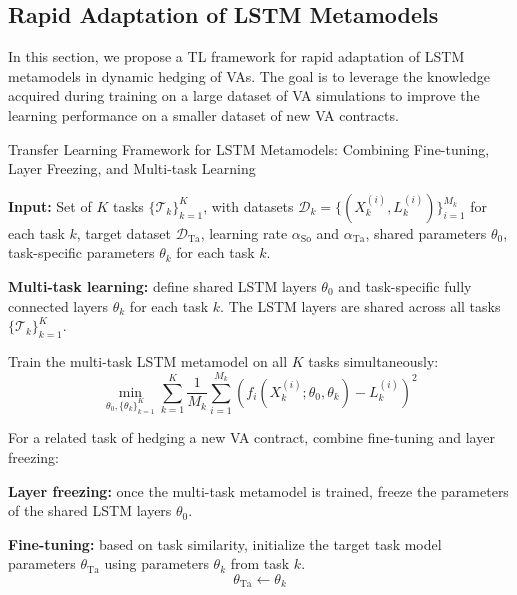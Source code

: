 \subsection{Rapid Adaptation of LSTM Metamodels} \label{sec3:transfer_learning}

In this section, we propose a TL framework for rapid adaptation of LSTM metamodels in dynamic hedging of VAs.
The goal is to leverage the knowledge acquired during training on a large dataset of VA simulations to improve the learning performance on a smaller dataset of new VA contracts.


\begin{algorithm}
    \caption{Transfer Learning Framework for LSTM Metamodels: Combining Fine-tuning, Layer Freezing, and Multi-task Learning}
    \begin{algorithmic}[1] \label{alg3:combined}
        \STATE \textbf{Input:} Set of $K$ tasks $\{\mathcal{T}_k\}_{k=1}^K$, with datasets $\mathcal{D}_k = \{(X_k^{(i)}, L_k^{(i)})\}_{i=1}^{M_k}$ for each task $k$, target dataset $\mathcal{D}_{\text{Ta}}$, learning rate $\alpha_{\text{So}}$ and $\alpha_{\text{Ta}}$, shared parameters $\theta_0$, task-specific parameters $\theta_k$ for each task $k$.
        
        \STATE \textbf{Multi-task learning:} define shared LSTM layers $\theta_0$ and task-specific fully connected layers $\theta_k$ for each task $k$. The LSTM layers are shared across all tasks $\{\mathcal{T}_k\}_{k=1}^K$.
        
        \STATE Train the multi-task LSTM metamodel on all $K$ tasks simultaneously:
        \begin{equation}
            \min_{\theta_0, \{\theta_k\}_{k=1}^K} \sum_{k=1}^K \frac{1}{M_k} \sum_{i=1}^{M_k} \left( f_i(X_k^{(i)}; \theta_0, \theta_k) - L_k^{(i)} \right)^2
        \end{equation}
        
        \STATE For a related task of hedging a new VA contract, combine fine-tuning and layer freezing:

        \STATE \textbf{Layer freezing:} once the multi-task metamodel is trained, freeze the parameters of the shared LSTM layers $\theta_0$.
        
        \STATE \textbf{Fine-tuning:}  based on task similarity, initialize the target task model parameters $\theta_{\text{Ta}}$ using parameters $\theta_k$ from task $k$.
        \[
        \theta_{\text{Ta}} \gets \theta_k 
        \]
        

\end{algorithmic}
\end{algorithm}
